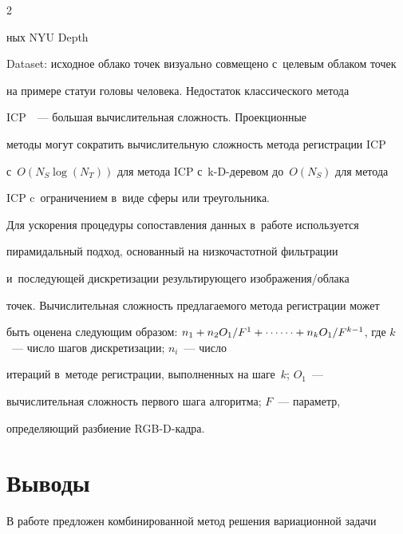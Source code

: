 \begin{multicols}{2}



\noindent

ных NYU Depth 

Dataset: исходное облако точек визуально совмещено с~целевым облаком точек 

на примере статуи головы человека. Недостаток классического метода 

ICP~\cite{6-voh}~--- большая вычислительная слож\-ность. Проекционные 

методы могут сократить вы\-чис\-ли\-тель\-ную слож\-ность метода регистрации ICP 

с~$O(N_S\log(N_T))$ для метода ICP с~k-D-де\-ре\-вом до~$O(N_S)$ для метода 

ICP c~ограничением в~виде сферы или треугольника.

  

  

  

  Для ускорения процедуры сопоставления данных в~работе используется 

пирамидальный подход, основанный на низкочастотной фильт\-ра\-ции 

и~по\-сле\-ду\-ющей дискретизации результирующего изоб\-ра\-же\-ния/об\-ла\-ка 

точек. Вы\-чис\-ли\-тель\-ная слож\-ность пред\-ла\-га\-емо\-го метода регистрации может 

быть оценена сле\-ду\-ющим образом: $n_1+ n_2O_1/F^1+\cdots\linebreak \cdots +  

n_kO_1/F^{k-1}$,  где $k$~--- чис\-ло шагов дискретизации; $n_i$~--- чис\-ло 

итераций в~методе регистрации, выполненных на шаге~$k$; $O_1$~--- 

вы\-чис\-ли\-тель\-ная слож\-ность первого шага алгоритма; $F$~--- параметр, 

опре\-де\-ля\-ющий разбиение RGB-D-кадра.



\vspace*{-6pt}



\section{Выводы}



  В работе предложен комбинированной метод решения вариационной задачи 


\end{multicols}
